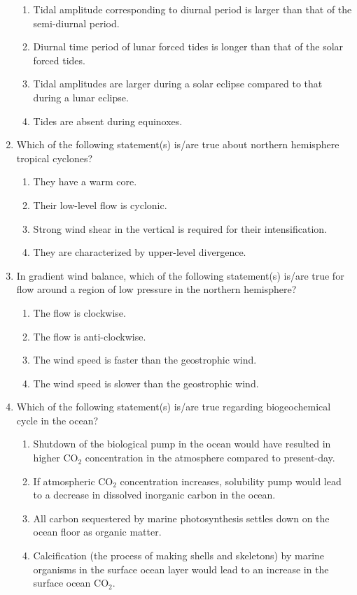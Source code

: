 \documentclass[a4paper,10pt]{article}
\begin{document}
\begin{enumerate}
\hfill{}
\begin{enumerate}
    \item Tidal amplitude corresponding to diurnal period is larger than that of the semi-diurnal period.
    \item Diurnal time period of lunar forced tides is longer than that of the solar forced tides.
    \item Tidal amplitudes are larger during a solar eclipse compared to that during a lunar eclipse.
    \item Tides are absent during equinoxes.
\end{enumerate}

\item Which of the following statement(s) is/are true about northern hemisphere tropical cyclones?

\hfill{}
\begin{enumerate}
    \item They have a warm core.
    \item Their low-level flow is cyclonic.
    \item Strong wind shear in the vertical is required for their intensification.
    \item They are characterized by upper-level divergence.
\end{enumerate}

\item In gradient wind balance, which of the following statement(s) is/are true for flow around a region of low pressure in the northern hemisphere?

\hfill{}
\begin{enumerate}
    \item The flow is clockwise.
    \item The flow is anti-clockwise.
    \item The wind speed is faster than the geostrophic wind.
    \item The wind speed is slower than the geostrophic wind.
\end{enumerate}

\item Which of the following statement(s) is/are true regarding biogeochemical cycle in the ocean?

\hfill{}
\begin{enumerate}
    \item Shutdown of the biological pump in the ocean would have resulted in higher CO$_2$ concentration in the atmosphere compared to present-day.
    \item If atmospheric CO$_2$ concentration increases, solubility pump would lead to a decrease in dissolved inorganic carbon in the ocean.
    \item All carbon sequestered by marine photosynthesis settles down on the ocean floor as organic matter.
    \item Calcification (the process of making shells and skeletons) by marine organisms in the surface ocean layer would lead to an increase in the surface ocean CO$_2$.
\end{enumerate}


\end{enumerate}
\end{document}
